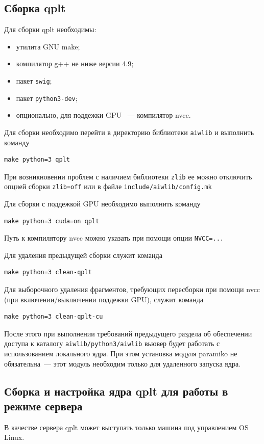 \documentclass[12pt]{article}
\begin{document}
\subsection{Сборка qplt}
Для сборки qplt необходимы:
\begin{itemize}
\item утилита GNU make;
\item компилятор g++ не ниже версии 4.9;
\item пакет \verb'swig';
\item пакет \verb'python3-dev';
\item опционально, для поддежки GPU ~--- компилятор nvcc.
\end{itemize}
Для сборки необходимо перейти в директорию библиотеки \verb'aiwlib' и выполнить команду
\begin{verbatim}
make python=3 qplt
\end{verbatim}
При возникновении проблем с наличием библиотеки \verb'zlib' ее можно отключить опцией сборки \verb'zlib=off'
или в файле \verb'include/aiwlib/config.mk'

Для сборки с поддежкой GPU необходимо выполнить команду
\begin{verbatim}
make python=3 cuda=on qplt
\end{verbatim}
Путь к компилятору nvcc можно указать при помощи опции \verb'NVCC=...'

Для удаления предыдущей сборки служит команда
\begin{verbatim}
make python=3 clean-qplt
\end{verbatim}
Для выборочного удаления фрагментов, требующих пересборки при помощи nvcc (при включении/выключении поддежки GPU), служит команда
\begin{verbatim}
make python=3 clean-qplt-cu
\end{verbatim}

После этого при выполнении требований предыдущего раздела об обеспечении доступа к каталогу \verb'aiwlib/python3/aiwlib'
вьювер будет работать с использованием локального ядра. При этом установка модуля paramiko не обязательна~--- этот модуль необходим только для удаленного запуска ядра. 


\subsection{Сборка и настройка ядра qplt для работы в режиме сервера}
В качестве сервера qplt может выступать только машина под управлением OS Linux.
\end{document}
